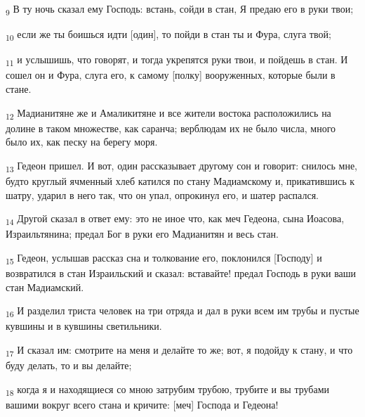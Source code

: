\begin{tcolorbox}
\textsubscript{9} В ту ночь сказал ему Господь: встань, сойди в стан, Я предаю его в руки твои;
\end{tcolorbox}
\begin{tcolorbox}
\textsubscript{10} если же ты боишься идти [один], то пойди в стан ты и Фура, слуга твой;
\end{tcolorbox}
\begin{tcolorbox}
\textsubscript{11} и услышишь, что говорят, и тогда укрепятся руки твои, и пойдешь в стан. И сошел он и Фура, слуга его, к самому [полку] вооруженных, которые были в стане.
\end{tcolorbox}
\begin{tcolorbox}
\textsubscript{12} Мадианитяне же и Амаликитяне и все жители востока расположились на долине в таком множестве, как саранча; верблюдам их не было числа, много было их, как песку на берегу моря.
\end{tcolorbox}
\begin{tcolorbox}
\textsubscript{13} Гедеон пришел. И вот, один рассказывает другому сон и говорит: снилось мне, будто круглый ячменный хлеб катился по стану Мадиамскому и, прикатившись к шатру, ударил в него так, что он упал, опрокинул его, и шатер распался.
\end{tcolorbox}
\begin{tcolorbox}
\textsubscript{14} Другой сказал в ответ ему: это не иное что, как меч Гедеона, сына Иоасова, Израильтянина; предал Бог в руки его Мадианитян и весь стан.
\end{tcolorbox}
\begin{tcolorbox}
\textsubscript{15} Гедеон, услышав рассказ сна и толкование его, поклонился [Господу] и возвратился в стан Израильский и сказал: вставайте! предал Господь в руки ваши стан Мадиамский.
\end{tcolorbox}
\begin{tcolorbox}
\textsubscript{16} И разделил триста человек на три отряда и дал в руки всем им трубы и пустые кувшины и в кувшины светильники.
\end{tcolorbox}
\begin{tcolorbox}
\textsubscript{17} И сказал им: смотрите на меня и делайте то же; вот, я подойду к стану, и что буду делать, то и вы делайте;
\end{tcolorbox}
\begin{tcolorbox}
\textsubscript{18} когда я и находящиеся со мною затрубим трубою, трубите и вы трубами вашими вокруг всего стана и кричите: [меч] Господа и Гедеона!
\end{tcolorbox}
